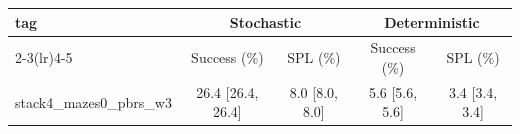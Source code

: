 \begin{tabular}{lcccc}
\toprule
tag & \multicolumn{2}{c}{Stochastic} & \multicolumn{2}{c}{Deterministic} \\
\cmidrule(lr){2-3}\cmidrule(lr){4-5}
 & Success (\%) & SPL (\%) & Success (\%) & SPL (\%) \\
\midrule
stack4_mazes0_pbrs_w3 & 26.4 {\scriptsize[26.4, 26.4]} & 8.0 {\scriptsize[8.0, 8.0]} & 5.6 {\scriptsize[5.6, 5.6]} & 3.4 {\scriptsize[3.4, 3.4]} \\
\bottomrule
\end{tabular}
